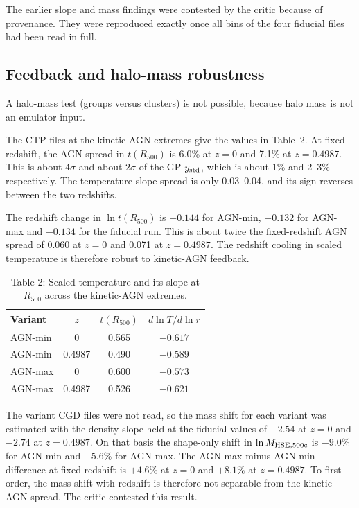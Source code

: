 \documentclass[11pt,a4paper]{article}
\begin{document}
The earlier slope and mass findings were contested by the critic because of provenance. They were reproduced exactly once all bins of the four fiducial files had been read in full.

\subsection{Feedback and halo-mass robustness}
A halo-mass test (groups versus clusters) is not possible, because halo mass is not an emulator input.

The CTP files at the kinetic-AGN extremes give the values in Table~2. At fixed redshift, the AGN spread in $t(R_{500})$ is 6.0\% at $z=0$ and 7.1\% at $z=0.4987$. This is about $4\sigma$ and about $2\sigma$ of the GP $y_{\rm std}$, which is about 1\% and 2--3\% respectively. The temperature-slope spread is only 0.03--0.04, and its sign reverses between the two redshifts.

The redshift change in $\ln t(R_{500})$ is $-0.144$ for AGN-min, $-0.132$ for AGN-max and $-0.134$ for the fiducial run. This is about twice the fixed-redshift AGN spread of 0.060 at $z=0$ and 0.071 at $z=0.4987$. The redshift cooling in scaled temperature is therefore robust to kinetic-AGN feedback.

\begin{table}
\centering
\begin{tabular}{lccc}
\toprule
Variant & $z$ & $t(R_{500})$ & $d\ln T/d\ln r$ \\
\midrule
AGN-min & 0 & 0.565 & $-0.617$ \\
AGN-min & 0.4987 & 0.490 & $-0.589$ \\
AGN-max & 0 & 0.600 & $-0.573$ \\
AGN-max & 0.4987 & 0.526 & $-0.621$ \\
\bottomrule
\end{tabular}
\caption*{Table 2: Scaled temperature and its slope at $R_{500}$ across the kinetic-AGN extremes.}
\end{table}

The variant CGD files were not read, so the mass shift for each variant was estimated with the density slope held at the fiducial values of $-2.54$ at $z=0$ and $-2.74$ at $z=0.4987$. On that basis the shape-only shift in $\ln M_{\rm HSE,500c}$ is $-9.0\%$ for AGN-min and $-5.6\%$ for AGN-max. The AGN-max minus AGN-min difference at fixed redshift is $+4.6\%$ at $z=0$ and $+8.1\%$ at $z=0.4987$. To first order, the mass shift with redshift is therefore not separable from the kinetic-AGN spread. The critic contested this result.
\end{document}
